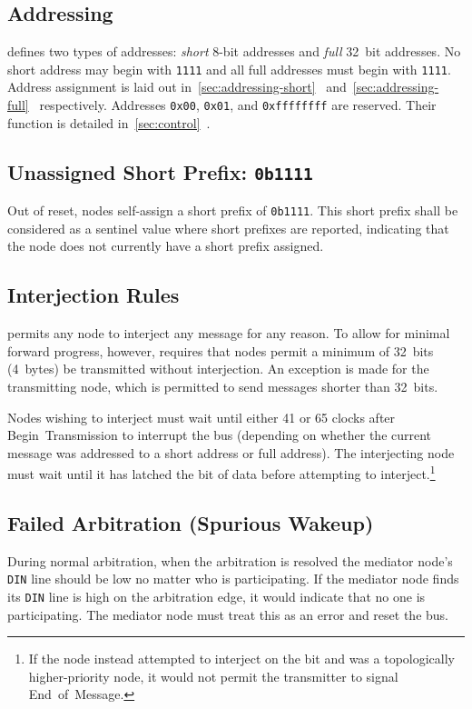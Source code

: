 \subsection{Addressing}
\label{sec:spec-address}
\bus defines two types of addresses: \textit{short} 8-bit addresses and
\textit{full} 32~bit addresses. No short address may begin with {\tt 1111} and
all full addresses must begin with {\tt 1111}. Address assignment is laid out
in~\ref{sec:addressing-short}~
and~\ref{sec:addressing-full}~ respectively.
%
Addresses {\tt 0x00}, {\tt 0x01}, and {\tt 0xffffffff} are reserved. Their
function is detailed in~\ref{sec:control}~.

\subsection{Unassigned Short Prefix: \texttt{0b1111}}
\label{sec:spec-unassigned-short-prefix}
Out of reset, nodes self-assign a short prefix of {\tt 0b1111}. This short
prefix shall be considered as a sentinel value where short prefixes are
reported, indicating that the node does not currently have a short prefix
assigned.

\subsection{Interjection Rules}
\label{sec:spec-interjection}
\bus permits any node to interject any message for any reason. To allow for
minimal forward progress, however, \bus requires that nodes permit a minimum
of 32~bits (4~bytes) be transmitted without interjection. An exception is made
for the transmitting node, which is permitted to send messages shorter than
32~bits.

Nodes wishing to interject must wait until either 41 or 65 clocks after
Begin~Transmission to interrupt the bus (depending on whether the current
message was addressed to a short address or full address). The interjecting
node must wait until it has latched the  bit of data before attempting
to interject.\footnote{
  If the node instead attempted to interject on the  bit and was a
  topologically higher-priority node, it would not permit the transmitter to
  signal End~of~Message.}

\subsection{Failed Arbitration (Spurious Wakeup)}
\label{sec:spec-spurious}
During normal arbitration, when the arbitration is resolved the mediator
node's {\tt DIN} line should be low no matter who is participating. If the
mediator node finds its {\tt DIN} line is high on the arbitration edge, it
would indicate that no one is participating. The mediator node must treat this
as an error and reset the bus.

